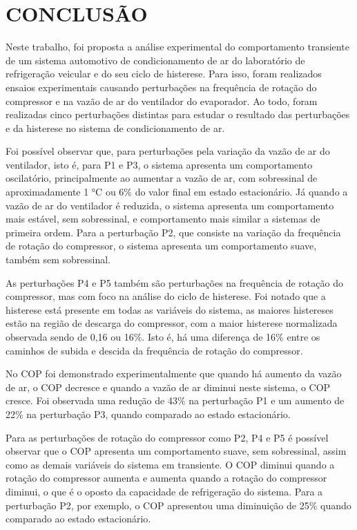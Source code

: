 \section{CONCLUSÃO}

Neste trabalho, foi proposta a análise experimental do comportamento transiente de um sistema automotivo de condicionamento de ar do laboratório de refrigeração veicular \textcite{reve2023} e do seu ciclo de histerese. Para isso, foram realizados ensaios experimentais causando perturbações na frequência de rotação do compressor e na vazão de ar do ventilador do evaporador. Ao todo, foram realizadas cinco perturbações distintas para estudar o resultado das perturbações e da histerese no sistema de condicionamento de ar. 

Foi possível observar que, para perturbações pela variação da vazão de ar do ventilador, isto é, para P1 e P3, o sistema apresenta um comportamento oscilatório, principalmente ao aumentar a vazão de ar, com sobressinal de aproximadamente 1 °C ou 6\% do valor final em estado estacionário. Já quando a vazão de ar do ventilador é reduzida, o sistema apresenta um comportamento mais estável, sem sobressinal, e comportamento mais similar a sistemas de primeira ordem. Para a perturbação P2, que consiste na variação da frequência de rotação do compressor, o sistema apresenta um comportamento suave, também sem sobressinal. 

As perturbações P4 e P5 também são perturbações na frequência de rotação do compressor, mas com foco na análise do ciclo de histerese. Foi notado que a histerese está presente em todas as variáveis do sistema, as maiores histereses estão na região de descarga do compressor, com a maior histerese normalizada observada sendo de 0,16 ou 16\%. Isto é, há uma diferença de 16\% entre os caminhos de subida e descida da frequência de rotação do compressor. 

No COP foi demonstrado experimentalmente que quando há aumento da vazão de ar, o COP decresce e quando a vazão de ar diminui neste sistema, o COP cresce. Foi observada uma redução de 43\% na perturbação P1 e um aumento de 22\% na perturbação P3, quando comparado ao estado estacionário. 

Para as perturbações de rotação do compressor como P2, P4 e P5 é possível observar que o COP apresenta um comportamento suave, sem sobressinal, assim como as demais variáveis do sistema em transiente. O COP diminui quando a rotação do compressor aumenta e aumenta quando a rotação do compressor diminui, o que é o oposto da capacidade de refrigeração do sistema. Para a perturbação P2, por exemplo, o COP apresentou uma diminuição de 25\% quando comparado ao estado estacionário. 

